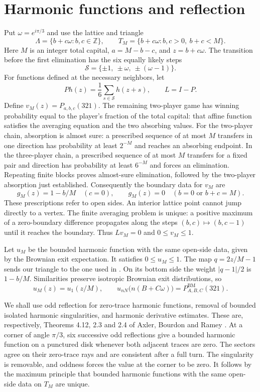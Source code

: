 \documentclass[11pt]{article}
\newcommand{\BM}{\mathrm{BM}}
\newcommand{\Sset}{\mathcal S}
\begin{document}
\section{Harmonic functions and reflection}

Put $\omega=e^{i\pi/3}$ and use the lattice and triangle
\[
 \Lambda=\{b+c\omega:b,c\in\mathbb Z\},\qquad
 T_M=\{b+c\omega:b,c>0,\ b+c<M\}.
\]
Here $M$ is an integer total capital, $a=M-b-c$, and $z=b+c\omega$.
The transition before the first elimination has the six equally likely steps
\[
 \Sset=\{\pm1,\ \pm\omega,\ \pm(\omega-1)\}.
\]
For functions defined at the necessary neighbors, let
\[
 Ph(z)=\frac16\sum_{s\in\Sset}h(z+s),\qquad L=I-P.
\]
Define $v_M(z)=P_{a,b,c}(321)$. The remaining two-player game has winning
probability equal to the player's fraction of the total capital: that affine
function satisfies the averaging equation and the two absorbing values.
For the two-player chain, absorption is almost sure: a prescribed sequence
of at most $M$ transfers in one direction has probability at least $2^{-M}$
and reaches an absorbing endpoint. In the three-player chain, a prescribed
sequence of at most $M$ transfers for a fixed pair and direction has probability
at least $6^{-M}$ and forces an elimination. Repeating finite blocks proves
almost-sure elimination, followed by the two-player absorption just established. Consequently the boundary data for
$v_M$ are
\begin{equation}\label{eq:boundary}
 g_M(z)=1-b/M\quad(c=0),\qquad
 g_M(z)=0\quad(b=0\text{ or }b+c=M).
\end{equation}
These prescriptions refer to open sides. An interior lattice point cannot
jump directly to a vertex. The finite averaging problem is unique:
a positive maximum of a zero-boundary difference propagates along the steps
$(b,c)\mapsto(b,c-1)$ until it reaches the boundary. Thus $Lv_M=0$ and
$0\le v_M\le1$.

Let $u_M$ be the bounded harmonic function with the same open-side data,
given by the Brownian exit expectation. It satisfies $0\le u_M\le1$.
The map $q=2z/M-1$ sends our triangle to the one used in
\cite[Theorem 4.1]{DE}. On its bottom side the weight $|q-1|/2$ is $1-b/M$.
Similarities preserve isotropic Brownian exit distributions, so
\begin{equation}\label{eq:bm}
 u_M(z)=u_1(z/M),\qquad
 u_{nN}\bigl(n(B+C\omega)\bigr)=P^{\BM}_{A,B,C}(321).
\end{equation}

We shall use odd reflection for zero-trace harmonic functions, removal of
bounded isolated harmonic singularities, and harmonic derivative estimates.
These are, respectively, Theorems 4.12, 2.3 and 2.4 of
Axler, Bourdon and Ramey \cite{HFT}.
At a corner of angle $\pi/3$, six successive odd reflections give a bounded
harmonic function on a punctured disk whenever both adjacent traces are zero.
The sectors agree on their zero-trace rays and are consistent after a full
turn. The singularity is removable, and oddness forces the value at the
corner to be zero. It follows by the maximum principle
\cite[Corollary 1.10]{HFT} that bounded harmonic functions with the same
open-side data on $T_M$ are unique.
\end{document}
